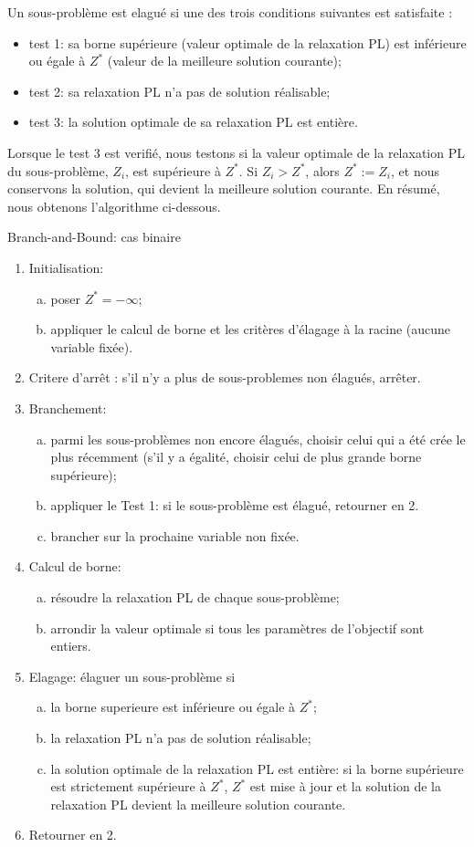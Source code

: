 Un sous-problème est elagué si une des trois conditions suivantes est satisfaite :
\begin{itemize}
\item
test 1: sa borne supérieure (valeur optimale de la relaxation PL) est inférieure ou égale à $Z^*$ (valeur de la meilleure solution courante);
\item
test 2: sa relaxation PL n'a pas de solution réalisable;
\item
test 3: la solution optimale de sa relaxation PL est entière.
\end{itemize}
Lorsque le test 3 est verifié, nous testons si la valeur optimale de la relaxation PL du sous-problème, $Z_i$, est supérieure à $Z^*$.
Si $Z_i > Z^*$, alors $Z^* := Z_i$, et nous conservons la solution, qui
devient la meilleure solution courante.
En résumé, nous obtenons l'algorithme ci-dessous.
\begin{algo}{Branch-and-Bound: cas binaire}
\begin{enumerate}
\item
Initialisation:
\begin{enumerate}[(a)]
\item
poser $Z^* = -\infty$;
\item
appliquer le calcul de borne et les critères d'élagage à la racine (aucune variable fixée).
\end{enumerate}
\item
Critere d'arrêt : s'il n'y a plus de sous-problemes non élagués, arrêter.
\item
Branchement:
\begin{enumerate}[(a)]
\item
parmi les sous-problèmes non encore élagués, choisir celui qui a été crée le plus récemment (s'il y a égalité, choisir celui de plus grande borne supérieure);
\item
appliquer le Test 1: si le sous-problème est élagué,
retourner en 2.
\item
brancher sur la prochaine variable non fixée.
\end{enumerate}
\item
Calcul de borne:
\begin{enumerate}[(a)]
\item
résoudre la relaxation PL de chaque sous-problème;
\item
arrondir la valeur optimale si tous les paramètres de l'objectif sont entiers.
\end{enumerate}
\item
Elagage: élaguer un sous-problème si
\begin{enumerate}[(a)]
\item
la borne superieure est inférieure ou égale à $Z^*$;
\item
la relaxation PL n'a pas de solution réalisable;
\item
la solution optimale de la relaxation PL est entière: si la borne supérieure est strictement supérieure à $Z^*$, $Z^*$ est mise à jour et la solution de la relaxation PL devient la meilleure solution courante.
\end{enumerate}
\item
 Retourner en 2.
\end{enumerate}
\end{algo}


